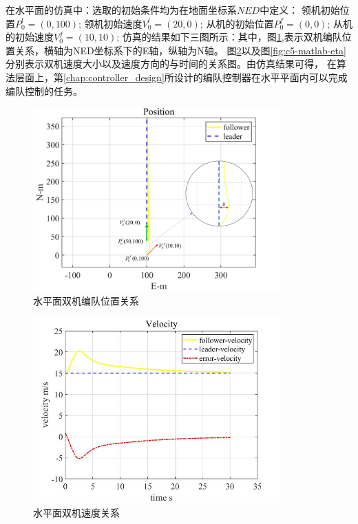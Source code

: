 在水平面的仿真中：选取的初始条件均为在地面坐标系$NED$中定义：
领机初始位置$P_{0}^{l}=(0,100)$;
领机初始速度$V_{0}^{l}=(20,0)$;
从机的初始位置$P_{0}^{f}=(0,0)$;
从机的初始速度$V_{0}^{f}=(10,10)$;
仿真的结果如下三图所示：其中，图\ref{fig:c5-matlab-pos},表示双机编队位置关系，横轴为NED坐标系下的E轴，纵轴为N轴。
图\ref{fig:c5-matlab-vel}以及图\ref{fig:c5-matlab-eta}分别表示双机速度大小以及速度方向的与时间的关系图。由仿真结果可得，
在算法层面上，第\ref{chap:controller_design}所设计的编队控制器在水平平面内可以完成编队控制的任务。
\begin{figure}[H]
    \centering
    \includegraphics[width=0.85\textwidth]{figures/c5/c5-matlab-pos.png}
    \caption{水平面双机编队位置关系}\label{fig:c5-matlab-pos}
\end{figure}
\begin{figure}[H]
    \centering
    \includegraphics[width=0.85\textwidth]{figures/c5/c5-matlab-vel.jpg}
    \caption{水平面双机速度关系}\label{fig:c5-matlab-vel}
\end{figure}
